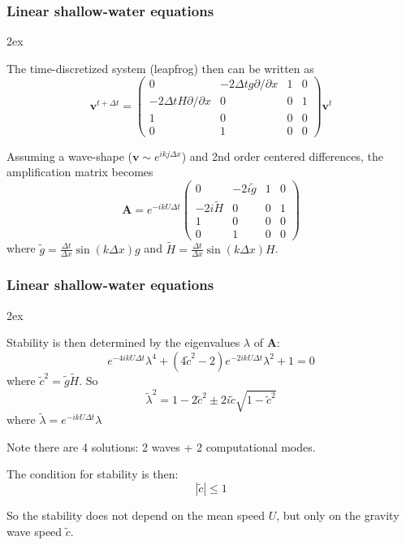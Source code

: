\documentclass[aspectratio=149,9pt]{beamer}
\begin{document}
%
%
\begin{frame}
	\frametitle{Linear shallow-water equations}
	\begin{myitemize}{2ex}
		\item The time-discretized system (leapfrog) then can be written as
			\begin{equation*}
				\bm v^{t+\Delta t} = \left(\begin{array}{cccc}
						0 & -2\Delta t g\partial/\partial x & 1 & 0 \\
						-2 \Delta t H\partial/\partial x & 0 & 0 & 1 \\
						1 & 0 & 0 & 0 \\
						0 & 1 & 0 & 0
					\end{array}\right)\bm v^t
			\end{equation*}
			
		\item Assuming a wave-shape ($\bm v\sim e^{ikj\Delta x}$) and 2nd order centered differences, the amplification matrix becomes
			\begin{equation*}
				\bm A=e^{-ikU\Delta t}\left(\begin{array}{cccc}
						0 & -2i\tilde g & 1 & 0 \\
						-2 i \tilde H & 0 & 0 & 1 \\
						1 & 0 & 0 & 0 \\
						0 & 1 & 0 & 0
					\end{array}\right)
			\end{equation*}
			where $\tilde g=\frac{\Delta t}{\Delta x}\sin(k\Delta x)g$ and $\tilde H=\frac{\Delta t}{\Delta x}\sin(k\Delta x)H$.
	\end{myitemize}
\end{frame}
%
%
\begin{frame}
	\frametitle{Linear shallow-water equations}
	\begin{myitemize}{2ex}
		\item Stability is then determined by the eigenvalues $\lambda$ of $\bm A$:
			\begin{equation*}
				e^{-4ikU\Delta t}\lambda^4 + \left( 4 \tilde c^2 - 2 \right) e^{-2ikU\Delta t}\lambda^2 +1 =0
			\end{equation*}
			where $\tilde c^2 = \tilde g \tilde H$. So
			\begin{equation*}
				\tilde \lambda^2 = 1 - 2 \tilde c^2 \pm 2 i \tilde c \sqrt{ 1 - \tilde c^2}
			\end{equation*}
			where $\tilde \lambda=e^{-ikU\Delta t}\lambda$
		\item Note there are 4 solutions: 2 waves + 2 computational modes.
		\item The condition for stability is then:
			\begin{equation*}
				| \tilde c | \le 1
			\end{equation*}
		\item So the stability does not depend on the mean speed $U$, but only on the gravity wave speed $\tilde c$.
	\end{myitemize}
\end{frame}
\end{document}

